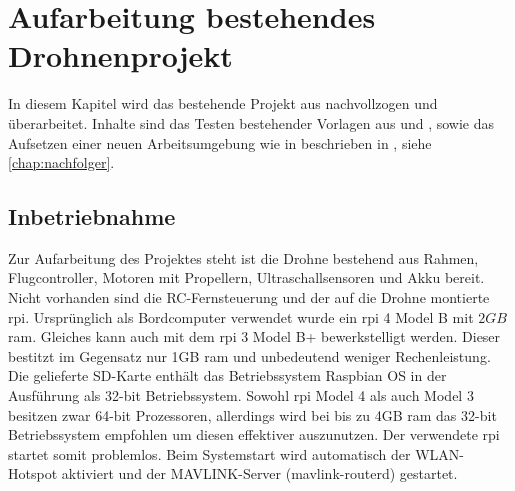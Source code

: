 \chapter{Aufarbeitung bestehendes Drohnenprojekt}\label{chap:main}
In diesem Kapitel wird das bestehende Projekt aus nachvollzogen und überarbeitet. Inhalte sind das Testen bestehender Vorlagen aus \cite{wirthErweiterungBestehendenDrohne2022} und \cite{wirthErweiterungBestehendenDrohne2022a}, sowie das Aufsetzen einer neuen Arbeitsumgebung wie in beschrieben in \cite{haraldwirthNachfolgerInfoStudienarbeitAutonome2022}, siehe \cref{chap:nachfolger}.

\section{Inbetriebnahme}\label{chap:einarbeite}
Zur Aufarbeitung des Projektes steht ist die Drohne bestehend aus Rahmen, Flugcontroller, Motoren mit Propellern, Ultraschallsensoren und Akku bereit. Nicht vorhanden sind die RC-Fernsteuerung und der auf die Drohne montierte \gls{rpi}. Ursprünglich als Bordcomputer verwendet wurde ein \gls{rpi} 4 Model B mit $2GB$ \gls{ram}. Gleiches kann auch mit dem \gls{rpi} 3 Model B+ bewerkstelligt werden. Dieser bestitzt im Gegensatz nur 1GB \gls{ram} und unbedeutend weniger Rechenleistung.
Die gelieferte SD-Karte enthält das Betriebssystem Raspbian OS in der Ausführung als 32-bit Betriebssystem. Sowohl \gls{rpi} Model 4 als auch Model 3 besitzen zwar 64-bit Prozessoren, allerdings wird bei bis zu 4GB \gls{ram} das 32-bit Betriebssystem empfohlen um diesen effektiver auszunutzen.
Der verwendete \gls{rpi} startet somit problemlos.
Beim Systemstart wird automatisch der WLAN-Hotspot aktiviert und der MAVLINK-Server (mavlink-routerd) gestartet. %

